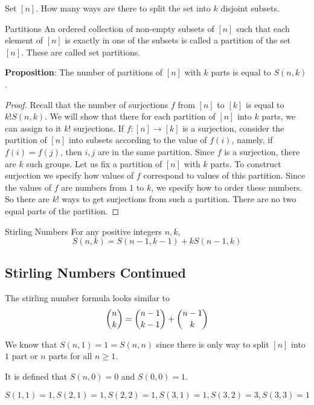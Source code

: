 \documentclass{report}
\begin{document}
Set $[n]$. How many ways are there to split the set into $k$ disjoint subsets.

\begin{definition}{Partitions}
    An ordered collection of non-empty subsets of $[n]$ such that each element of $[n]$ is exactly in one of the subsets is called a partition of the set $[n]$. These are called set partitions.
\end{definition}

\textbf{Proposition}: The number of partitions of $[n]$ with $k$ parts is equal to $S(n, k)$.
    \begin{proof}
        Recall that the number of surjections $f$ from $[n]$ to $[k]$ is equal to $k!S(n, k)$. We will show that there for each partition of $[n]$ into $k$ parts, we can assign to it $k!$ surjections. If $f : [n] \rightarrow [k]$ is a surjection, consider the partition of $[n]$ into subsets according to the value of $f(i)$, namely, if $f(i) = f(j)$, then $i, j$ are in the same partition. Since $f$ is a surjection, there are $k$ such groups. Let us fix a partition of $[n]$ with $k$ parts. To construct surjection we specify how values of $f$ correspond to values of this partition. Since the values of $f$ are numbers from $1$ to $k$, we specify how to order these numbers. So there are $k!$ ways to get surjections from such a partition. There are no two equal parts of the partition.
    \end{proof} 

\begin{theorem}{Stirling Numbers}
    For any positive integers $n, k$,
        \begin{equation*}
            S(n, k) = S(n - 1, k - 1) + kS(n - 1, k)
        \end{equation*}
\end{theorem}

\begin{topic}
    \section{Stirling Numbers Continued}
\end{topic}

The stirling number formula looks similar to
    \begin{equation*}
        \dbinom{n}{k} = \dbinom{n - 1}{k - 1} + \dbinom{n - 1}{k}
    \end{equation*}

\begin{examples}
    \begin{example}
        We know that $S(n, 1) = 1 = S(n, n)$ since there is only way to split $[n]$ into $1$ part or $n$ parts for all $n \geq 1$.
    \end{example}
    \begin{example}
        It is defined that $S(n, 0) = 0$ and $S(0, 0) = 1$.
    \end{example}
    \begin{example}
        $S(1, 1) = 1, S(2, 1) = 1, S(2, 2) = 1, S(3, 1) = 1, S(3, 2) = 3, S(3, 3) = 1$
    \end{example}
\end{examples}
\end{document}
